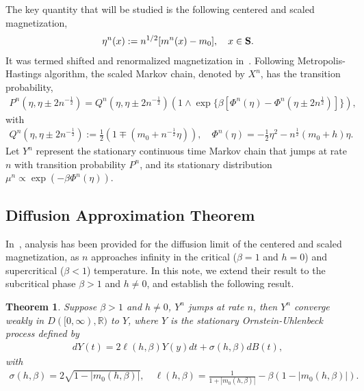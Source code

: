 \documentclass{amsart}
\newcommand{\bS}{{\bf S}}               %
\newcommand{\Real}{\mathbb R}
\newtheorem{thm}{Theorem}
\begin{document}
         The key quantity that will be studied is the following centered and scaled magnetization,
         \begin{align*}
         	\eta^n (x) := n^{1/2} [m^n(x)-m_0], \quad x\in \bS.
         \end{align*}
         It was termed shifted and renormalized magnetization in~\cite{bierkens2017}. Following Metropolis-Hastings algorithm, the scaled Markov chain, denoted by $X^n$, has the transition probability,
         \begin{align*}
         	P^n(\eta, \eta\pm 2n^{-\frac12}) = Q^n(\eta,  \eta\pm 2n^{-\frac12})(1\wedge \exp\{\beta[\Phi^n(\eta)-\Phi^n( \eta\pm 2n^{\frac12})]\}),
         \end{align*}
         with
         \begin{align*}
         	Q^n(\eta,  \eta\pm 2n^{-\frac12}):= \frac12(1\mp (m_0+ n^{-\frac12} \eta)), \quad \Phi^n(\eta)=-\frac12 \eta^2-n^\frac12(m_0+h)\eta.
         \end{align*}
         Let $Y^n$ represent the stationary continuous time Markov chain that jumps at rate $n$ with transition probability $P^n$, and its stationary distribution $\mu^n \propto \exp(-\beta \Phi^n(\eta))$. 
         
         \subsection{Diffusion Approximation Theorem}
         
         In~\cite{bierkens2017}, analysis has been provided for the diffusion limit of the centered and scaled magnetization, as $n$ approaches infinity in the critical ($\beta=1$ and $h=0$) and supercritical ($\beta<1$) temperature. 
         In this note, we extend their result to the subcritical phase $\beta>1$ and $h\neq 0$, and establish the following result. 
         \begin{thm}
         	\label{thm:main}
         	Suppose $\beta>1$ and $h\neq 0$, $Y^n$ jumps at rate $n$, then $Y^n$ converge weakly in $D([0,\infty), \Real)$  to $Y$, where $Y$ is the stationary Ornstein-Uhlenbeck process defined by
         	\begin{align}
         		\label{eqn:limiting-diffusion}
         		dY(t) = 2\ell(h, \beta) Y(y) dt + \sigma(h, \beta) dB(t),
         	\end{align}
         	with \begin{align*}
         		\sigma(h, \beta)=2\sqrt{1-|m_0(h, \beta)|}, \quad \ell(h, \beta)=\frac{1}{1+|m_0(h, \beta)|}-\beta(1-|m_0(h, \beta)|).
         	\end{align*}
         \end{thm}
         
\end{document}
